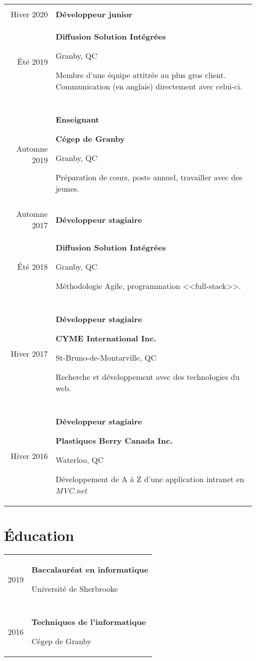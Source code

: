 \documentclass[french]{article}
\newcommand{\separation}{\multicolumn{1}{c}{} \\}
\begin{document}
	\begin{tabu} to \textwidth {r|X}
		\separation{}
		Hiver 2020 & {\large \bfseries Développeur junior} \\
		Été 2019 & {

			\textbf{Diffusion Solution Intégrées}

			{\footnotesize Granby, QC}

			Membre d'une équipe attitrée au plus gros client. Communication (en anglais) directement avec celui-ci.
		} \\

		\separation{}

		Automne 2019 & {
			{\large \bfseries Enseignant}

			\textbf{Cégep de Granby}

			{\footnotesize Granby, QC}

			Préparation de cours, poste annuel, travailler avec des jeunes.
		} \\


		\separation{}
		Automne 2017 & {\large \bfseries Développeur stagiaire} \\
		Été 2018 & {
			\textbf{Diffusion Solution Intégrées}

			{\footnotesize Granby, QC}

			Méthodologie Agile, programmation <<full-stack>>.
		} \\

		\separation{}
		Hiver 2017 & {
			{\large \bfseries Développeur stagiaire}

			\textbf{CYME International Inc.}

			{\footnotesize St-Bruno-de-Montarville, QC}

			Recherche et développement avec des technologies du web.
		} \\

		\separation{}
		Hiver 2016 & {
			{\large \bfseries Développeur stagiaire}

			\textbf{Plastiques Berry Canada Inc.}

			{\footnotesize Waterloo, QC}

			Développement de A à Z d'une application intranet en \textit{MVC.net}
		} \\
	\end{tabu}

	\section{Éducation}
	\begin{tabu} to \textwidth {r|X}
		2019 & {
			{\large \bfseries Baccalauréat en informatique}

			Université de Sherbrooke
		} \\
		\separation{}
		2016 & {
			{\large \bfseries Techniques de l'informatique}

			Cégep de Granby
		} \\
	\end{tabu}
\end{document}
